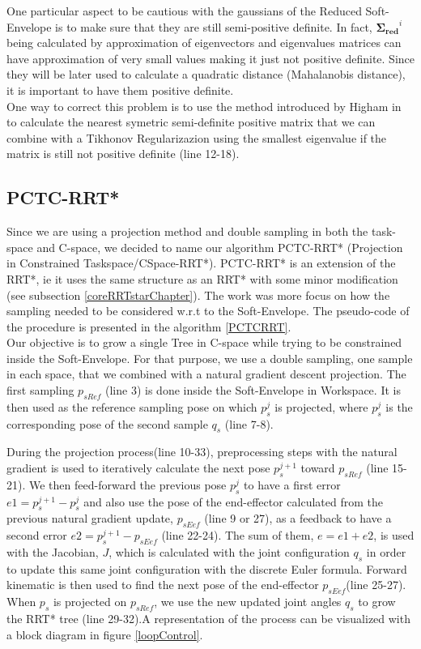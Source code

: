 \documentclass[letterpaper, 10 pt, conference]{ieeeconf}  %
\newcommand{\mb}[1]{{\boldsymbol{#1}}}
\begin{document}
One particular aspect to be cautious with the gaussians of the Reduced Soft-Envelope is to make sure that they are still semi-positive definite. In fact, $\mb{\Sigma_{red}}^{i}$ being calculated by approximation of eigenvectors and eigenvalues matrices can have approximation of very small values making it just not positive definite. Since they will be later used to calculate a quadratic distance (Mahalanobis distance), it is important to have them positive definite.\\
One way to correct this problem is to use the method introduced by Higham in \cite{Nearest_PSDMATRIX} to calculate the nearest symetric semi-definite positive matrix that we can combine with a Tikhonov Regularizazion using the smallest eigenvalue if the matrix is still not positive definite (line 12-18).

\subsection{PCTC-RRT*} 
Since we are using a projection method and double sampling in both the  task-space and C-space,  we decided to name our algorithm PCTC-RRT* (Projection in Constrained Taskspace/CSpace-RRT*). PCTC-RRT* is an extension of the RRT*, ie it uses the same structure as an RRT* with some minor modification (see subsection \ref{coreRRTstarChapter}). The work was more focus on how the sampling needed to be considered w.r.t to the Soft-Envelope. The pseudo-code of the procedure is presented in the algorithm \ref{PCTCRRT}.\\
Our objective is to grow a single Tree in C-space while trying to be constrained inside the Soft-Envelope. For that purpose, we use a double sampling, one sample in each space, that we combined with a natural gradient descent projection.
The first sampling $p_{sRef}$ (line 3) is done inside the Soft-Envelope in Workspace. It is then used as the reference sampling pose on which $p_s^j$ is projected, where $p_s^j$ is the corresponding pose of the second sample $q_s$ (line 7-8).

During the projection process(line 10-33), preprocessing steps with the natural gradient is used to iteratively calculate the next pose $p_s^{j+1}$ toward $p_{sRef}$  (line 15-21). We then feed-forward the previous pose $p_s^{j}$ to have a first error $e1=p_s^{j+1} - p_s^{j}$ and also use the pose of the end-effector calculated from the previous natural gradient update, $p_{sEef}$ (line 9 or 27), as a feedback to have a second error $e2=p_s^{j+1} -p_{sEef}$ (line 22-24). The sum of them, $e=e1+e2$, is used with the Jacobian, $J$, which is calculated with the joint configuration $q_s$ in order to update this same joint configuration with the discrete Euler formula. Forward kinematic is then used to find the next pose of the end-effector $p_{sEef}$(line 25-27). When $p_s$ is projected on $p_{sRef}$, we use the new updated joint angles $q_s$ to grow the RRT* tree (line 29-32).A representation of the process can be visualized with a block diagram in figure \ref{loopControl}.\\
\end{document}
